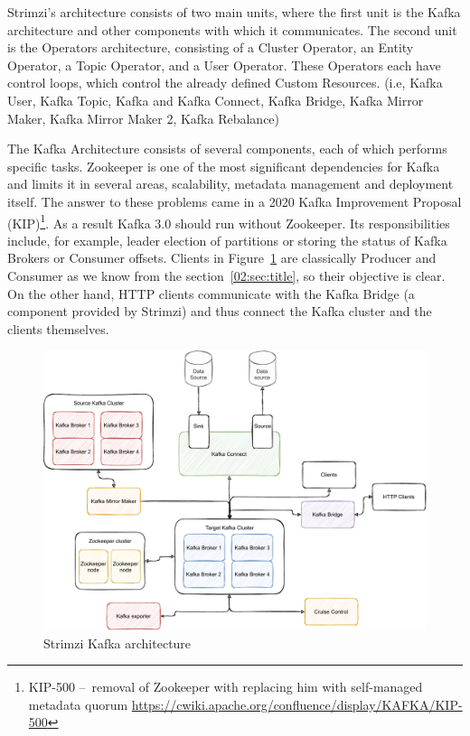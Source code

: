 Strimzi's architecture consists of two main units, where the first unit is the Kafka architecture and other components with which it communicates.
The second unit is the Operators architecture, consisting of a Cluster Operator, an Entity Operator, a Topic Operator, and a User Operator.
These Operators each have control loops, which control the already defined Custom Resources. (i.e, Kafka User, Kafka Topic, Kafka and Kafka Connect, Kafka Bridge, Kafka Mirror Maker, Kafka Mirror Maker 2, Kafka Rebalance)

The Kafka Architecture consists of several components, each of which performs specific tasks.
Zookeeper is one of the most significant dependencies for Kafka and limits it in several areas, scalability, metadata management and deployment itself.
The answer to these problems came in a 2020 Kafka Improvement Proposal (KIP)\footnote{KIP-500 \---\ removal of Zookeeper with replacing him with self-managed metadata quorum \url{https://cwiki.apache.org/confluence/display/KAFKA/KIP-500}}.
As a result Kafka 3.0 should run without Zookeeper.
Its responsibilities include, for example, leader election of partitions or storing the status of Kafka Brokers or Consumer offsets.
Clients in Figure~\ref{03:fig:strimziKafkaArchitecture} are classically Producer and Consumer as we know from the section~\ref{02:sec:title}, so their objective is clear.
On the other hand, HTTP clients communicate with the Kafka Bridge (a component provided by Strimzi) and thus connect the Kafka cluster and the clients themselves.
\begin{figure}[!ht]
    \centering
    \includegraphics[scale=0.70]{obrazky-figures/02-preliminaries/03-strimzi/03-strimzi-kafka-architecture (1)}
    \caption{Strimzi Kafka architecture}
    \label{03:fig:strimziKafkaArchitecture}
\end{figure}
